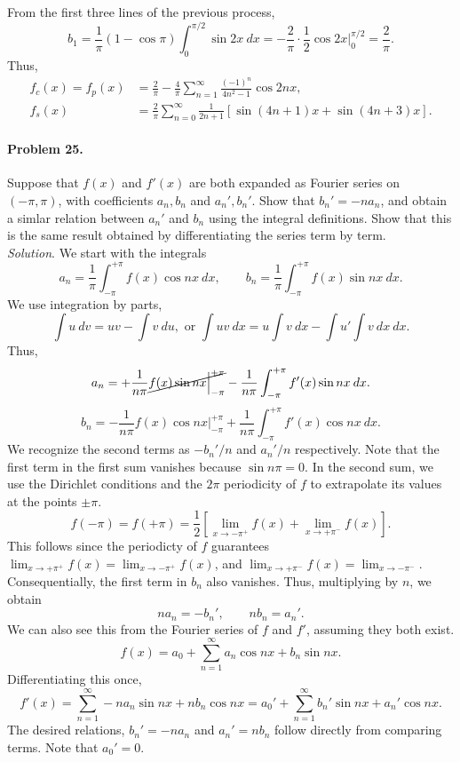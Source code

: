 \documentclass[10pt]{article}
\begin{document}
        From the first three lines of the previous process,
        \[
                b_1 =  \frac{1}{\pi}(1 - \cos{\pi})\int_0^{\pi/2} \sin{2x}\:dx = -\frac{2}{\pi}\cdot \frac{1}{2}\cos{2x}\Big|_0^{\pi/2} = \frac{2}{\pi}.
        \]
        Thus,
        \begin{align*}
                f_c(x) = f_p(x) &= \frac{2}{\pi} - \frac{4}{\pi}\sum_{n = 1}^\infty \frac{(-1)^n}{4n^2 - 1}\cos{2nx}, \\
                f_s(x) &= \frac{2}{\pi}\sum_{n = 0}^\infty \frac{1}{2n + 1}\left[\sin{(4n + 1)x} + \sin{(4n + 3)x}\right].
        \end{align*}

        \paragraph{Problem 25.} Suppose that $f(x)$ and $f'(x)$ are both expanded as Fourier series on $(-\pi, \pi)$, with coefficients $a_n, b_n$
        and $a_n', b_n'$. Show that $b_n' = -na_n$, and obtain a simlar relation between $a_n'$ and $b_n$ using the integral definitions.
        Show that this is the same result obtained by differentiating the series term by term. \\

        \textit{Solution}. We start with the integrals
        \[
                a_n = \frac{1}{\pi}\int_{-\pi}^{+\pi} f(x)\cos{nx}\:dx, \qquad
                b_n = \frac{1}{\pi}\int_{-\pi}^{+\pi} f(x)\sin{nx}\:dx.
        \]
        We use integration by parts,
        \[
                \int u\:dv = uv - \int v\:du, \text{ or } \int uv\:dx = u\int v\:dx - \int u'\int v\:dx\:dx.
        \]
        Thus,
        \[
                a_n = +\frac{1}{n\pi}\cancel{f(x)\sin{nx}\Big|_{-\pi}^{+\pi}} - \frac{1}{n\pi}\int_{-\pi}^{+\pi}f'(x)\sin{nx}\:dx.
        \]
        \[
                b_n = -\frac{1}{n\pi}f(x)\cos{nx}\Big|_{-\pi}^{+\pi} + \frac{1}{n\pi}\int_{-\pi}^{+\pi}f'(x)\cos{nx}\:dx.
        \]
        We recognize the second terms as $-b_n' /n$ and $a_n' /n$ respectively.
        Note that the first term in the first sum vanishes because $\sin{n\pi} = 0$.
        In the second sum, we use the Dirichlet conditions and the $2\pi$ periodicity of $f$ to extrapolate its values at the points $\pm\pi$.
        \[f(-\pi) = f(+\pi) = \frac{1}{2}\left[\lim_{x \to -\pi^+} f(x) + \lim_{x \to +\pi^-} f(x)\right].\]
        This follows since the periodicty of $f$ guarantees $\lim_{x \to +\pi^+} f(x) = \lim_{x \to -\pi^+} f(x)$, and 
        $\lim_{x \to +\pi^-}f(x) = \lim_{x \to -\pi^-}$.
        Consequentially, the first term in $b_n$ also vanishes.
        Thus, multiplying by $n$, we obtain
        \[
                n a_n = -b_n', \qquad nb_n = a_n'.
        \]
        We can also see this from the Fourier series of $f$ and $f'$, assuming they both exist.
        \[
                f(x) = a_0 + \sum_{n = 1}^\infty a_n\cos{nx} + b_n\sin{nx}.
        \]
        Differentiating this once,
        \[
                f'(x) = \sum_{n = 1}^\infty -na_n\sin{nx} + nb_n\cos{nx} = a_0' + \sum_{n = 1}^\infty b_n'\sin{nx} + a_n'\cos{nx}.
        \]
        The desired relations, $b_n' = -na_n$ and $a_n' = nb_n$ follow directly from comparing terms. Note that $a_0' = 0$.
\end{document}
